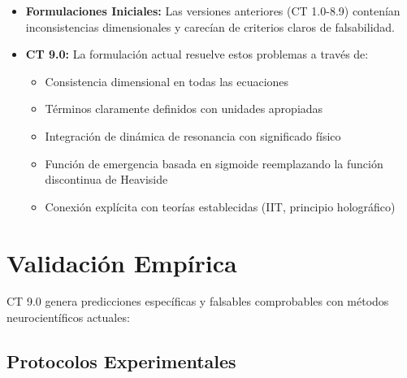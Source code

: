 \documentclass[12pt]{article}
\begin{document}
\begin{itemize}
    \item \textbf{Formulaciones Iniciales:} Las versiones anteriores (CT 1.0-8.9) contenían inconsistencias dimensionales y carecían de criterios claros de falsabilidad.
    
    \item \textbf{CT 9.0:} La formulación actual resuelve estos problemas a través de:
    \begin{itemize}[label=--]
        \item Consistencia dimensional en todas las ecuaciones
        \item Términos claramente definidos con unidades apropiadas
        \item Integración de dinámica de resonancia con significado físico
        \item Función de emergencia basada en sigmoide reemplazando la función discontinua de Heaviside
        \item Conexión explícita con teorías establecidas (IIT, principio holográfico)
    \end{itemize}
\end{itemize}

\section{Validación Empírica}
CT 9.0 genera predicciones específicas y falsables comprobables con métodos neurocientíficos actuales:

\subsection{Protocolos Experimentales}
\end{document}

